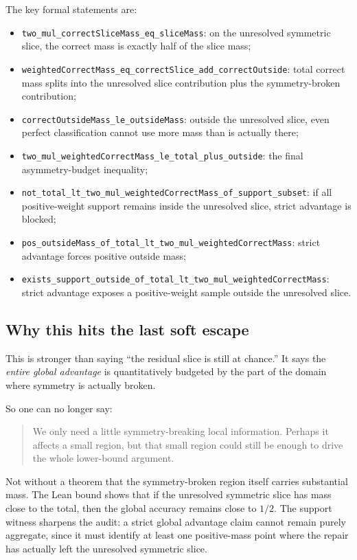 \documentclass[11pt]{article}
\theoremstyle{remark}
\begin{document}
\noindent
The key formal statements are:
\begin{itemize}[leftmargin=1.5em]
  \item \texttt{two\_mul\_correctSliceMass\_eq\_sliceMass}: on the unresolved symmetric slice, the
  correct mass is exactly half of the slice mass;
  \item \texttt{weightedCorrectMass\_eq\_correctSlice\_add\_correctOutside}: total correct mass
  splits into the unresolved slice contribution plus the symmetry-broken contribution;
  \item \texttt{correctOutsideMass\_le\_outsideMass}: outside the unresolved slice, even perfect
  classification cannot use more mass than is actually there;
  \item \texttt{two\_mul\_weightedCorrectMass\_le\_total\_plus\_outside}: the final asymmetry-budget
  inequality;
  \item \texttt{not\_total\_lt\_two\_mul\_weightedCorrectMass\_of\_support\_subset}: if all
  positive-weight support remains inside the unresolved slice, strict advantage is blocked;
  \item \texttt{pos\_outsideMass\_of\_total\_lt\_two\_mul\_weightedCorrectMass}: strict advantage
  forces positive outside mass;
  \item \texttt{exists\_support\_outside\_of\_total\_lt\_two\_mul\_weightedCorrectMass}: strict
  advantage exposes a positive-weight sample outside the unresolved slice.
\end{itemize}

\subsection{Why this hits the last soft escape}

This is stronger than saying ``the residual slice is still at chance.''  It says the \emph{entire
global advantage} is quantitatively budgeted by the part of the domain where symmetry is actually
broken.

So one can no longer say:
\begin{quote}
We only need a little symmetry-breaking local information.  Perhaps it affects a small region, but
that small region could still be enough to drive the whole lower-bound argument.
\end{quote}

Not without a theorem that the symmetry-broken region itself carries substantial mass.  The Lean
bound shows that if the unresolved symmetric slice has mass close to the total, then the global
accuracy remains close to \(1/2\).  The support witness sharpens the audit: a strict global
advantage claim cannot remain purely aggregate, since it must identify at least one positive-mass
point where the repair has actually left the unresolved symmetric slice.
\end{document}
